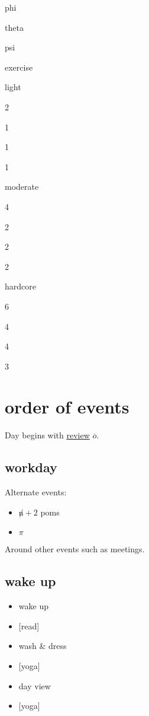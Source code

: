 \documentclass[]{book}
\providecommand{\tightlist}{%
  \setlength{\itemsep}{0pt}\setlength{\parskip}{0pt}}
\begin{document}
phi

theta

psi

exercise

light

2

1

1

1

moderate

4

2

2

2

hardcore

6

4

4

3

\hypertarget{order-of-events}{%
\section{order of events}\label{order-of-events}}

Day begins with \protect\hyperlink{review}{review} \(\overline o\).

\hypertarget{workday}{%
\subsection{workday}\label{workday}}

Alternate events:

\begin{itemize}
\tightlist
\item
  \(\not n + 2\) poms
\item
  \(\pi\)
\end{itemize}

Around other events such as meetings.

\hypertarget{wake-up}{%
\subsection{wake up}\label{wake-up}}

\begin{itemize}
\tightlist
\item
  wake up
\item
  {[}read{]}
\item
  wash \& dress
\item
  {[}yoga{]}
\item
  \protect\hypertarget{day-view}{}{day view}
\item
  {[}yoga{]}
\end{itemize}
\end{document}
